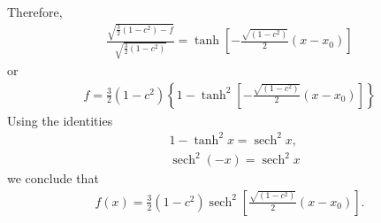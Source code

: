\documentclass[12pt,reqno]{amsart}
\numberwithin{equation}{section}  %
\def\sech{\operatorname{sech}}
\begin{document}
%
%
Therefore,
%
%
\begin{equation*}
\begin{split}
  \frac{\sqrt{\frac{3}{2}(1-c^{2}) - f}}{\sqrt{\frac{3}{2}(1-c^{2})}} =
  \tanh \left [- \frac{\sqrt{(1-c^{2})}}{2}(x -x_{0}) \right ] 
\end{split}
\end{equation*}
%
%
or
%
%
%
\begin{equation*}
\begin{split}
  f = \frac{3}{2}(1-c^{2}) \left \{ 1 - \tanh^{2} \left [- \frac{\sqrt{(1-c^{2})}}{2}(x -x_{0})
  \right ] \right \}
  \end{split}
\end{equation*}
%
%
Using the identities
%
%
\begin{equation*}
\begin{split}
  & 1 - \tanh^{2}x = \sech^{2}x,
  \\
  & \sech^{2}(-x) = \sech^{2}x
\end{split}
\end{equation*}
%
we conclude that
%
%
\begin{equation*}
\begin{split}
  f(x) = \frac{3}{2}(1-c^{2}) \sech^{2} \left [\frac{\sqrt{(1-c^{2})}}{2}(x -x_{0})
  \right ]. 
  \end{split}
\end{equation*}
%
%
%

%
%
%
%
%
%
\end{document}
